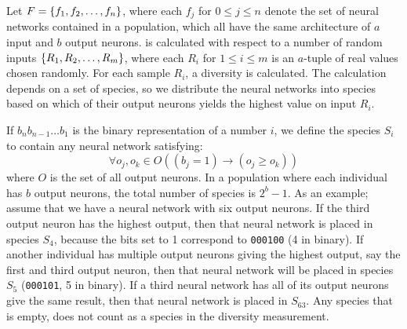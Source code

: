 Let $F = \left\{ f_1, f_2, \dots, f_n \right\}$, where each $f_j$ for $0 \leq j \leq n$ denote the set of neural networks contained in a population, which all have the same architecture of $a$ input and $b$ output neurons. \dia{} is calculated with respect to a number of random inputs $\left\{ R_1, R_2, \dots, R_m \right\}$, where each $R_i$ for $1 \leq i \leq m$ is an $a$-tuple of real values chosen randomly. For each sample $R_i$, a diversity is calculated. The calculation depends on a set of species, so we distribute the neural networks into species based on which of their output neurons yields the highest value on input $R_i$. 

If $b_nb_{n-1}\dots{}b_1$ is the binary representation of a number $i$,
we define the species $S_i$ to contain any neural network satisfying:
\[\forall o_j, o_k \in O \left(\left(b_j=1\right) \rightarrow \left(o_j \geq o_k\right)\right)\]
where $O$ is the set of all output neurons.
In a population where each individual has $b$ output neurons, the total number of species is $2^b - 1$.  As an example; assume that we have a neural network with six output neurons. If the third output neuron has the highest output, then that neural network is placed in species $S_4$, because the bits set to 1 correspond to \texttt{000100} (4 in binary). If another individual has multiple output neurons giving the highest output, say the first and third output neuron, then that neural network will be placed in species $S_5$ (\texttt{000101}, 5 in binary). If a third neural network has all of its output neurons give the same result, then that neural network is placed in $S_{63}$. Any species that is empty, does not count as a species in the diversity measurement.


%
%


